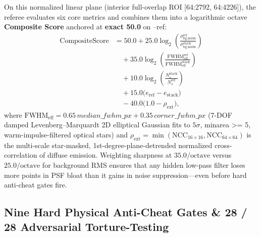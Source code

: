 \documentclass[10pt,twocolumn,letterpaper]{article}
\DeclareRobustCommand{\code}[1]{\texttt{#1}}
\def\code#1{#1}%
\begin{document}
On this normalized linear plane (interior full-overlap ROI \code{[64:2792, 64:4226]}), the referee evaluates six core metrics and combines them into a logarithmic octave \textbf{Composite Score} anchored at \textbf{exact \code{50.0}} on \code{--ref}:
\begin{equation}
  \begin{aligned}
    \text{CompositeScore} &= 50.0
    + 25.0\log_2\!\left(\frac{\sigma_{\text{bg,norm}}^{\text{ref}}}{\sigma_{\text{bg,norm}}^{\text{stack}}}\right) \\
    &\quad + 35.0\log_2\!\left(\frac{\text{FWHM}_{\text{eff}}^{\text{ref}}}{\text{FWHM}_{\text{eff}}^{\text{stack}}}\right) \\
    &\quad + 10.0\log_2\!\left(\frac{N_\star^{\text{stack}}}{N_\star^{\text{ref}}}\right) \\
    &\quad + 15.0\big(e_{\text{ref}} - e_{\text{stack}}\big) \\
    &\quad - 40.0\big(1.0 - \rho_{\text{ext}}\big),
  \end{aligned}
  \label{eq:composite_score}
\end{equation}
where $\text{FWHM}_{\text{eff}} = 0.65\,\code{median\_fwhm\_px} + 0.35\,\code{corner\_fwhm\_px}$ (7-DOF damped Levenberg--Marquardt 2D elliptical Gaussian fits to $5\sigma$, \code{minarea >= 5}, warm-impulse-filtered optical stars) and $\rho_{\text{ext}} = \min(\text{NCC}_{16\times 16}, \text{NCC}_{64\times 64})$ is the multi-scale star-masked, 1st-degree-plane-detrended normalized cross-correlation of diffuse emission. Weighting sharpness at $35.0/\text{octave}$ versus $25.0/\text{octave}$ for background RMS ensures that any hidden low-pass filter loses more points in PSF bloat than it gains in noise suppression---even before hard anti-cheat gates fire.

\subsection{Nine Hard Physical Anti-Cheat Gates \& \code{28 / 28} Adversarial Torture-Testing}
\end{document}
